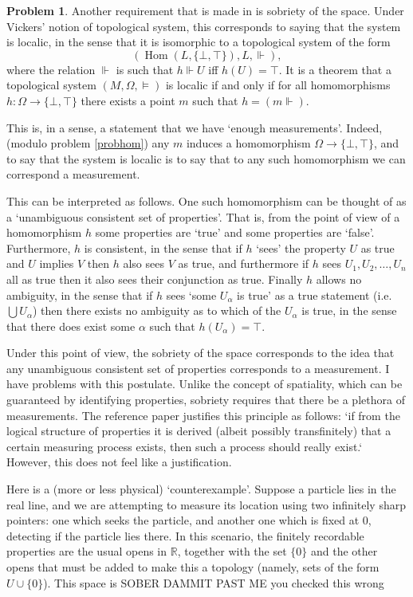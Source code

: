 \documentclass{article}
\theoremstyle{definition}
\newtheorem{problem}{Problem}
\DeclareMathOperator{\Hom}{Hom}
\newcommand{\R}{\mathbb{R}}
\begin{document}
\begin{problem}
Another requirement that is made in \cite{measurement} is sobriety of the space. Under Vickers' notion of topological system, this corresponds to saying that the system is localic, in the sense that it is isomorphic to a topological system of the form
\[(\Hom(L, \{\bot, \top\}), L, \Vdash),\]
where the relation $\Vdash$ is such that $h \Vdash U$ iff $h(U) = \top$. It is a theorem that a topological system $(M, \Omega, \vDash)$ is localic if and only if for all homomorphisms $h : \Omega \to \{\bot, \top\}$ there exists a point $m$ such that $h = (m \Vdash)$.

This is, in a sense, a statement that we have `enough measurements'. Indeed, (modulo problem \ref{probhom}) any $m$ induces a homomorphism $\Omega \to \{\bot,\top\}$, and to say that the system is localic is to say that to any such homomorphism we can correspond a measurement.

This can be interpreted as follows. One such homomorphism can be thought of as a `unambiguous consistent set of properties'. That is, from the point of view of a homomorphism $h$ some properties are `true' and some properties are `false'. Furthermore, $h$ is consistent, in the sense that if $h$ `sees' the property $U$ as true and $U$ implies $V$ then $h$ also sees $V$ as true, and furthermore if $h$ sees $U_1, U_2, \dots, U_n$ all as true then it also sees their conjunction as true. Finally $h$ allows no ambiguity, in the sense that if $h$ sees `some $U_\alpha$ is true' as a true statement (i.e. $\bigcup U_\alpha$) then there exists no ambiguity as to which of the $U_\alpha$ is true, in the sense that there does exist some $\alpha$ such that $h(U_\alpha) = \top$.

Under this point of view, the sobriety of the space corresponds to the idea that any unambiguous consistent set of properties corresponds to a measurement. I have problems with this postulate. Unlike the concept of spatiality, which can be guaranteed by identifying properties, sobriety requires that there be a plethora of measurements. The reference paper \cite{measurement} justifies this principle as follows: `if from the logical structure of properties it is derived (albeit possibly transfinitely) that a certain measuring process exists, then such a process should really exist.` However, this does not feel like a justification.

Here is a (more or less physical) `counterexample'. Suppose a particle lies in the real line, and we are attempting to measure its location using two infinitely sharp pointers: one which seeks the particle, and another one which is fixed at 0, detecting if the particle lies there. In this scenario, the finitely recordable properties are the usual opens in $\R$, together with the set $\{0\}$ and the other opens that must be added to make this a topology (namely, sets of the form $U \cup \{0\}$). This space is SOBER DAMMIT PAST ME you checked this wrong
\end{problem}

{}

\end{document}
